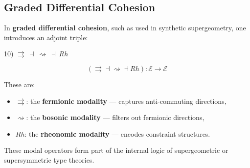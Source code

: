 \documentclass{article}
\begin{document}
\newpage
\subsection{Graded Differential Cohesion}

In \textbf{graded differential cohesion}, such as used in synthetic supergeometry, one introduces an adjoint triple:


10) $\rightrightarrows\ \dashv\ \rightsquigarrow\ \dashv\ Rh$

\[
(\rightrightarrows \dashv \rightsquigarrow \dashv Rh) : \mathcal{E} \to \mathcal{E}
\]

These are:
\begin{itemize}
  \item $\rightrightarrows$: the \textbf{fermionic modality} — captures anti-commuting directions,
  \item $\rightsquigarrow$: the \textbf{bosonic modality} — filters out fermionic directions,
  \item $Rh$: the \textbf{rheonomic modality} — encodes constraint structures.
\end{itemize}

These modal operators form part of the internal logic of supergeometric or supersymmetric type theories.
\end{document}
